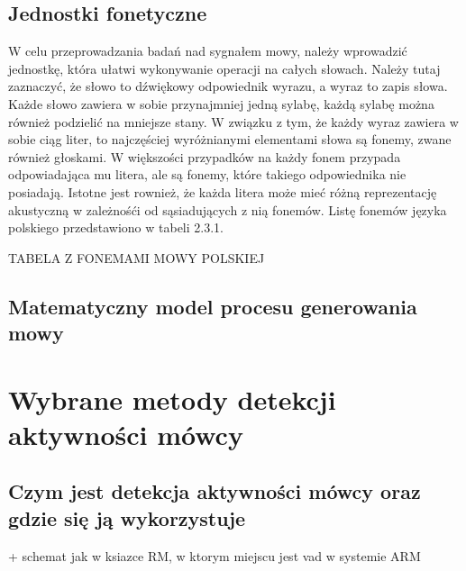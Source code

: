 \documentclass[eng,printmode]{mgr}
\begin{document}
 \section{Jednostki fonetyczne}
 W celu przeprowadzania badań nad sygnałem mowy, należy wprowadzić jednostkę, która ułatwi wykonywanie operacji na całych słowach. Należy tutaj zaznaczyć, że słowo to dźwiękowy odpowiednik wyrazu, a wyraz to zapis słowa. Każde słowo zawiera w sobie przynajmniej jedną sylabę, każdą sylabę można również podzielić na mniejsze stany. W związku z tym, że każdy wyraz zawiera w sobie ciąg liter, to najczęściej wyróżnianymi elementami słowa są fonemy, zwane również głoskami. W większości przypadków na każdy fonem przypada odpowiadająca mu litera, ale są fonemy, które takiego odpowiednika nie posiadają. Istotne jest rownież, że każda litera może mieć różną reprezentację akustyczną w zależnośći od sąsiadujących z nią fonemów. Listę fonemów języka polskiego przedstawiono w tabeli 2.3.1.
 
 TABELA Z FONEMAMI MOWY POLSKIEJ
 
 \section{Matematyczny model procesu generowania mowy}
 
 

\chapter{Wybrane metody detekcji aktywności mówcy}
 \section{Czym jest detekcja aktywności mówcy oraz gdzie się ją wykorzystuje}
 + schemat jak w ksiazce RM, w ktorym miejscu jest vad w systemie ARM
 
\end{document}
